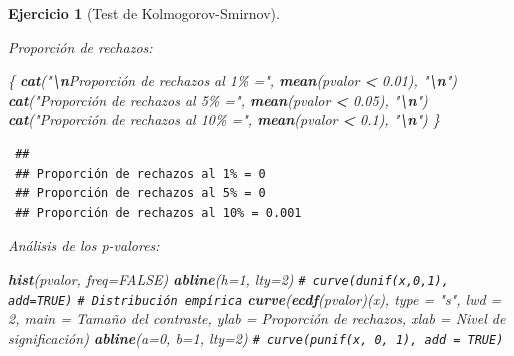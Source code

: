 \documentclass[
  spanish,
  10pt,
]{book}
\newenvironment{Shaded}{\begin{snugshade}}{\end{snugshade}}
\newcommand{\AttributeTok}[1]{\textcolor[rgb]{0.13,0.29,0.53}{#1}}
\newcommand{\CommentTok}[1]{\textcolor[rgb]{0.56,0.35,0.01}{\textit{#1}}}
\newcommand{\ConstantTok}[1]{\textcolor[rgb]{0.56,0.35,0.01}{#1}}
\newcommand{\DecValTok}[1]{\textcolor[rgb]{0.00,0.00,0.81}{#1}}
\newcommand{\FloatTok}[1]{\textcolor[rgb]{0.00,0.00,0.81}{#1}}
\newcommand{\FunctionTok}[1]{\textcolor[rgb]{0.13,0.29,0.53}{\textbf{#1}}}
\newcommand{\NormalTok}[1]{#1}
\newcommand{\SpecialCharTok}[1]{\textcolor[rgb]{0.81,0.36,0.00}{\textbf{#1}}}
\newcommand{\StringTok}[1]{\textcolor[rgb]{0.31,0.60,0.02}{#1}}
\theoremstyle{break}
\newtheorem{exercise}{Ejercicio}[chapter]
\theoremstyle{nonumberplain}
\renewcommand{\CommentTok}[1]{\textcolor[rgb]{0.41,0.41,0.41}{\texttt{#1}}}
\begin{document}
\begin{exercise}[Test de Kolmogorov-Smirnov]
\begin{enumerate}
  Proporción de rechazos:

\begin{Shaded}
\begin{Highlighting}[]
\NormalTok{\{}
  \FunctionTok{cat}\NormalTok{(}\StringTok{"}\SpecialCharTok{\textbackslash{}n}\StringTok{Proporción de rechazos al 1\% ="}\NormalTok{, }\FunctionTok{mean}\NormalTok{(pvalor }\SpecialCharTok{\textless{}} \FloatTok{0.01}\NormalTok{), }\StringTok{"}\SpecialCharTok{\textbackslash{}n}\StringTok{"}\NormalTok{)}
  \FunctionTok{cat}\NormalTok{(}\StringTok{"Proporción de rechazos al 5\% ="}\NormalTok{, }\FunctionTok{mean}\NormalTok{(pvalor }\SpecialCharTok{\textless{}} \FloatTok{0.05}\NormalTok{), }\StringTok{"}\SpecialCharTok{\textbackslash{}n}\StringTok{"}\NormalTok{)}
  \FunctionTok{cat}\NormalTok{(}\StringTok{"Proporción de rechazos al 10\% ="}\NormalTok{, }\FunctionTok{mean}\NormalTok{(pvalor }\SpecialCharTok{\textless{}} \FloatTok{0.1}\NormalTok{), }\StringTok{"}\SpecialCharTok{\textbackslash{}n}\StringTok{"}\NormalTok{)}
\NormalTok{\}}
\end{Highlighting}
\end{Shaded}

\begin{verbatim}
 ## 
 ## Proporción de rechazos al 1% = 0 
 ## Proporción de rechazos al 5% = 0 
 ## Proporción de rechazos al 10% = 0.001
\end{verbatim}

  Análisis de los p-valores:

\begin{Shaded}
\begin{Highlighting}[]
\FunctionTok{hist}\NormalTok{(pvalor, }\AttributeTok{freq=}\ConstantTok{FALSE}\NormalTok{)}
\FunctionTok{abline}\NormalTok{(}\AttributeTok{h=}\DecValTok{1}\NormalTok{, }\AttributeTok{lty=}\DecValTok{2}\NormalTok{)   }\CommentTok{\# curve(dunif(x,0,1), add=TRUE)}
\CommentTok{\# Distribución empírica}
\FunctionTok{curve}\NormalTok{(}\FunctionTok{ecdf}\NormalTok{(pvalor)(x), }\AttributeTok{type =} \StringTok{"s"}\NormalTok{, }\AttributeTok{lwd =} \DecValTok{2}\NormalTok{, }
      \AttributeTok{main =} \StringTok{\textquotesingle{}Tamaño del contraste\textquotesingle{}}\NormalTok{, }\AttributeTok{ylab =} \StringTok{\textquotesingle{}Proporción de rechazos\textquotesingle{}}\NormalTok{, }
      \AttributeTok{xlab =} \StringTok{\textquotesingle{}Nivel de significación\textquotesingle{}}\NormalTok{)}
\FunctionTok{abline}\NormalTok{(}\AttributeTok{a=}\DecValTok{0}\NormalTok{, }\AttributeTok{b=}\DecValTok{1}\NormalTok{, }\AttributeTok{lty=}\DecValTok{2}\NormalTok{)   }\CommentTok{\# curve(punif(x, 0, 1), add = TRUE)}
\end{Highlighting}
\end{Shaded}


\end{enumerate}
\end{exercise}
\end{document}
